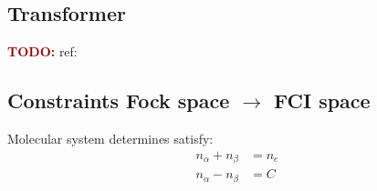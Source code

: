 
\subsection{Transformer}
\textcolor{darkred}{\textbf{TODO:}} ref:\cite{zhang2023transformer,wu2023nnqs}

\subsection{Constraints Fock space \texorpdfstring{$\rightarrow$}{→} FCI space}

Molecular system determines satisfy:
\begin{equation}
    \begin{split}
    n_{\alpha} + n_{\beta} & = n_e \\
    n_{\alpha} - n_{\beta} & = C \\
    \end{split}
\end{equation}

